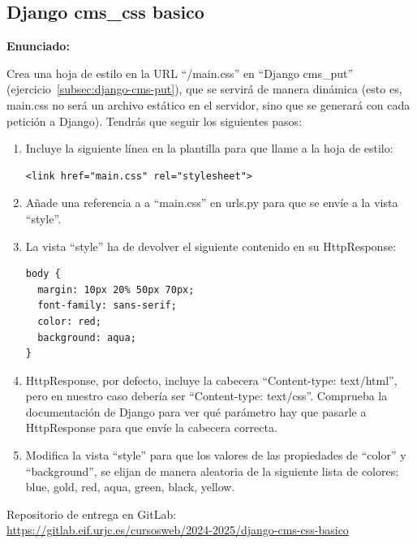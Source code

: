 \subsection{Django cms\_css basico}
\label{subsec:django-cms-css-basico}

\textbf{Enunciado:}

Crea una hoja de estilo en la URL ``/main.css'' en ``Django cms\_put'' (ejercicio~\ref{subsec:django-cms-put}), que se servirá de manera dinámica (esto es, main.css no será un archivo estático en el servidor, sino que se generará con cada petición a Django). Tendrás que seguir los siguientes pasos:

\begin{enumerate}

\item Incluye la siguiente línea en la plantilla para que llame a la hoja de estilo: 

\begin{verbatim}
<link href="main.css" rel="stylesheet">
\end{verbatim}

\item Añade una referencia a a ``main.css'' en urls.py para que se envíe a la vista ``style''.

\item La vista ``style'' ha de devolver el siguiente contenido en su HttpResponse:

\begin{verbatim}
body {
  margin: 10px 20% 50px 70px;
  font-family: sans-serif;
  color: red;
  background: aqua;
}
\end{verbatim}

\item HttpResponse, por defecto, incluye la cabecera ``Content-type: text/html'', pero en nuestro caso debería ser ``Content-type: text/css''. Comprueba la documentación de Django para ver qué parámetro hay que pasarle a HttpResponse para que envíe la cabecera correcta.

\item Modifica la vista ``style'' para que los valores de las propiedades de ``color'' y ``background'', se elijan de manera aleatoria de la siguiente lista de colores: blue, gold, red, aqua, green, black, yellow.
\end{enumerate}

Repositorio de entrega en GitLab: \\
\url{https://gitlab.eif.urjc.es/cursosweb/2024-2025/django-cms-css-basico}

